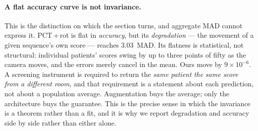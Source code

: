 \paragraph{A flat accuracy curve is not invariance.} This is the distinction on which the section
turns, and aggregate MAD cannot express it. PCT\,+\,rot is flat in \emph{accuracy}, but its
\emph{degradation} --- the movement of a given sequence's own score --- reaches $\mathbf{3.03}$~MAD.
Its flatness is statistical, not structural: individual patients' scores swing by up to three points
of fifty as the camera moves, and the errors merely cancel in the mean. Ours move by
$9\times10^{-6}$. A screening instrument is required to return the \emph{same patient the same score
from a different room}, and that requirement is a statement about each prediction, not about a
population average. Augmentation buys the average; only the architecture buys the guarantee. This is
the precise sense in which the invariance is a theorem rather than a fit, and it is why we report
degradation and accuracy side by side rather than either alone.

